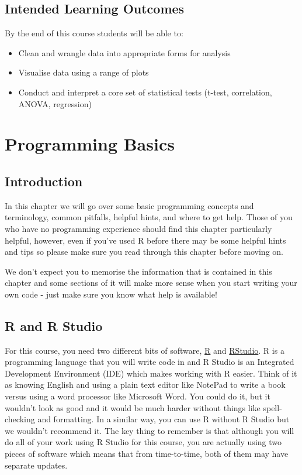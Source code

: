 \documentclass[]{book}
\providecommand{\tightlist}{%
  \setlength{\itemsep}{0pt}\setlength{\parskip}{0pt}}
\begin{document}
\hypertarget{intended-learning-outcomes}{%
\section{Intended Learning Outcomes}\label{intended-learning-outcomes}}

By the end of this course students will be able to:

\begin{itemize}
\tightlist
\item
  Clean and wrangle data into appropriate forms for analysis
\item
  Visualise data using a range of plots
\item
  Conduct and interpret a core set of statistical tests (t-test, correlation, ANOVA, regression)
\end{itemize}

\hypertarget{ref3}{%
\chapter{Programming Basics}\label{ref3}}

\hypertarget{introduction}{%
\section{Introduction}\label{introduction}}

In this chapter we will go over some basic programming concepts and terminology, common pitfalls, helpful hints, and where to get help. Those of you who have no programming experience should find this chapter particularly helpful, however, even if you've used R before there may be some helpful hints and tips so please make sure you read through this chapter before moving on.

We don't expect you to memorise the information that is contained in this chapter and some sections of it will make more sense when you start writing your own code - just make sure you know what help is available!

\hypertarget{r-and-r-studio}{%
\section{R and R Studio}\label{r-and-r-studio}}

For this course, you need two different bits of software, \href{https://www.r-project.org/}{R} and \href{https://www.rstudio.com/products/rstudio/download/\#download}{RStudio}. R is a programming language that you will write code in and R Studio is an Integrated Development Environment (IDE) which makes working with R easier. Think of it as knowing English and using a plain text editor like NotePad to write a book versus using a word processor like Microsoft Word. You could do it, but it wouldn't look as good and it would be much harder without things like spell-checking and formatting. In a similar way, you can use R without R Studio but we wouldn't recommend it. The key thing to remember is that although you will do all of your work using R Studio for this course, you are actually using two pieces of software which means that from time-to-time, both of them may have separate updates.
\end{document}
